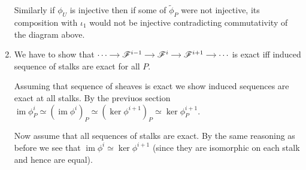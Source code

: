 \begin{enumerate}
Similarly if $\phi_{U}$ is injective then if some of $\tilde{\phi}_{P}$  were not injective, its composition with $\iota_{1}$ would not be injective contradicting commutativity of the diagram above. 

\item We have to show that 
$\begin{tikzcd}[cramped, sep=small] \cdots \arrow[r] & \mathscr{F}^{i-1} \arrow[r] & \mathscr{F}^{i} \arrow[r] & \mathscr{F}^{i+1} \arrow[r] & \cdots \end{tikzcd}$
is exact iff induced sequence of stalks are exact for all $P$.

Assuming that sequence of sheaves is exact we show induced sequences are exact at all stalks. By the previuos section $\operatorname{im} \phi_{P}^i \simeq (\operatorname{im} \phi^i)_{P}\simeq(\ker \phi^{i+1})_{P}\simeq \ker \phi_{P}^{i + 1}$.

Now assume that all sequences of stalks are exact.  By the same reasoning as before we see that  $\operatorname{im} \phi^{i}\simeq \ker \phi^{i+1}$ (since they are isomorphic on each stalk and hence are equal).
\end{enumerate}